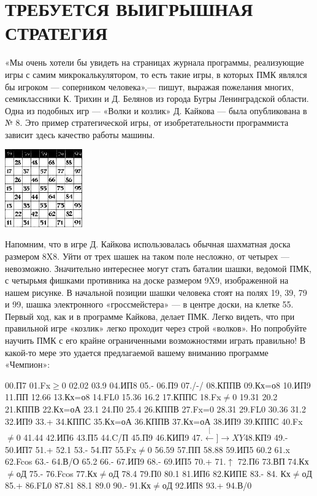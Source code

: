 \documentclass[11pt,a4paper,oneside]{article}
\def\XY{$\stackrel[\leftarrow]{\rightarrow}{XY}$}
\begin{document}
\section{ТРЕБУЕТСЯ ВЫИГРЫШНАЯ СТРАТЕГИЯ}

«Мы очень хотели бы увидеть на страницах журнала программы, реализующие игры с самим микрокалькулятором, то есть такие игры, в которых ПМК являлся бы игроком — соперником человека»,— пишут, выражая пожелания многих, семиклассники К. Трихин и Д. Белянов из города Бугры Ленинградской области. Одна из подобных игр — «Волки и козлик» Д. Кайкова — была опубликована в № 8. Это пример стратегической игры, от изобретательности программиста зависит здесь качество работы машины.

\includegraphics[width=0.25\textwidth]{win_strategy}

Напомним, что в игре Д. Кайкова использовалась обычная шахматная доска размером 8X8. Уйти от трех шашек на таком поле несложно, от четырех — невозможно. Значительно интереснее могут стать баталии шашки, ведомой ПМК, с четырьмя фишками противника на доске размером 9X9, изображенной на нашем рисунке. В начальной позиции шашки человека стоят на полях 19, 39, 79 и 99, шашка электронного «гроссмейстера» — в центре доски, на клетке 55. Первый ход, как и в программе Кайкова, делает ПМК. Легко видеть, что при правильной игре «козлик» легко проходит через строй «волков». Но попробуйте научить ПМК с его крайне ограниченными возможностями играть правильно! В какой-то мере это удается предлагаемой вашему вниманию программе «Чемпион»: 

00.П7 01.Fx$\geq$0 02.02 03.9 04.ИП8 05.- 06.П9 07./-/ 08.КППВ 09.Кх=о8 10.ИП9 11.ПП 12.66 13.Кх=о8 14.FL0 15.36
16.2 17.КППС 18.Fx$\neq$0 19.31 20.2 21.КППВ 22.Кх=оА 23.1 24.П0 25.4
26.КППВ 27.Fx=0 28.31 29.FL0 30.36
31.2 32.ИП9 33.+ 34.КППС 35.Кх=оА 36.КППВ 37.Кх=оА 38.ИП9 39.КППС
40.Fx$\neq$0 41.44 42.ИП6 43.П5 44.C/П
45.П9 46.КИП9 47.\XY 48.КП9 49.- 50.ИП7 51.+ 52.1 53.- 54.П7 55.Fx$\neq$0 56.59 57.ПП 58.88 59.ИП5 60.2 61.x 62.Fcos 63.- 64.В/О 65.2 66.- 67.ИП9 68.- 69.ИП5 70.+ 71.$\uparrow$ 72.П6 73.ВП 74.Кх$\neq$оД 75.- 76.Fcos 77.Кх$\neq$оД 78.4 79.П0 80.1 81.ИП6 82.КИПЕ 83.-
84. Кх$\neq$оД 85.+ 86.FL0 87.81 88.1 89.0 90.- 91.Кх$\neq$оД 92.ИП8 93.+ 94.В/0
\end{document}
